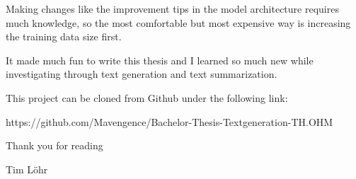 Making changes like the improvement tips in the model architecture requires much knowledge, so the most comfortable but most expensive way is increasing the training data size first. 

It made much fun to write this thesis and I learned so much new while investigating through text generation and text summarization.

This project can be cloned from Github under the following link:

\begin{tcolorbox}
	https://github.com/Mavengence/Bachelor-Thesis-Textgeneration-TH.OHM
\end{tcolorbox}

Thank you for reading

Tim Löhr
